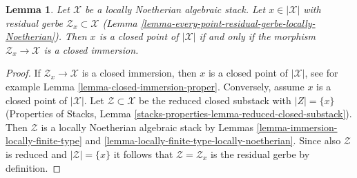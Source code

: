 \documentclass[10pt,a4paper]{amsart}
\theoremstyle{plain}
\newtheorem{lemma}[subsection]{Lemma}
\theoremstyle{definition}
\theoremstyle{remark}
\numberwithin{equation}{subsection}
\begin{document}
\begin{lemma}
\label{lemma-residual-space-closed}
Let $\mathcal{X}$ be a locally Noetherian algebraic stack.
Let $x \in |\mathcal{X}|$ with residual gerbe
$\mathcal{Z}_x \subset \mathcal{X}$
(Lemma \ref{lemma-every-point-residual-gerbe-locally-Noetherian}).
Then $x$ is a closed point of $|\mathcal{X}|$ if and only if
the morphism $\mathcal{Z}_x \to \mathcal{X}$ is a closed immersion.
\end{lemma}

\begin{proof}
If $\mathcal{Z}_x \to \mathcal{X}$ is a closed immersion, then
$x$ is a closed point of $|\mathcal{X}|$, see for example
Lemma \ref{lemma-closed-immersion-proper}.
Conversely, assume $x$ is a closed point of $|\mathcal{X}|$.
Let $\mathcal{Z} \subset \mathcal{X}$
be the reduced closed substack with $|Z| = \{x\}$
(Properties of Stacks,
Lemma \ref{stacks-properties-lemma-reduced-closed-substack}).
Then $\mathcal{Z}$ is a locally Noetherian algebraic stack
by Lemmas \ref{lemma-immersion-locally-finite-type} and
\ref{lemma-locally-finite-type-locally-noetherian}.
Since also $\mathcal{Z}$ is reduced and $|\mathcal{Z}| = \{x\}$
it follows that $\mathcal{Z} = \mathcal{Z}_x$ is the
residual gerbe by definition.
\end{proof}
\end{document}
